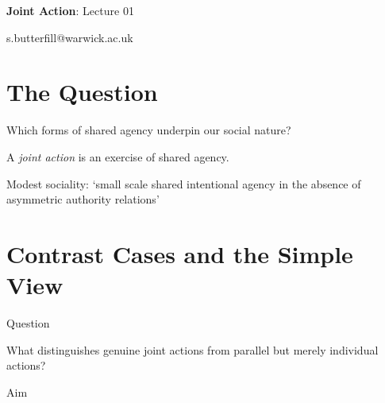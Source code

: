 \documentclass[12pt]{extarticle}
\date{}
\makeatletter
\def \ititle {Origins of Mind}
\def \isubtitle {Lecture 01}
\def \iemail{s.butterfill@warwick.ac.uk}
\makeatother
\begin{document}
\begin{multicols*}{3}

\setlength\footnotesep{1em}








      

    
      
\def \ititle {Joint Action}
 
\def \isubtitle {Lecture 01}
 
\begin{center}
 
{\Large
 
\textbf{\ititle}: \isubtitle
 
}
 
 
 
\iemail %
 
\end{center}
 
 
 
\section{The Question}
 
Which forms of shared agency underpin our social nature?

 
A \emph{joint action} is an exercise of shared agency.
 
Modest sociality: ‘small scale shared intentional agency in the absence of 
asymmetric authority relations’
\citep[p.~150]{Bratman:2009lv}
 
 
 
\section{Contrast Cases and the Simple View}
 
Question


            
What distinguishes genuine joint actions from parallel but merely individual actions?
            

 
Aim



\end{multicols*}
\end{document}
